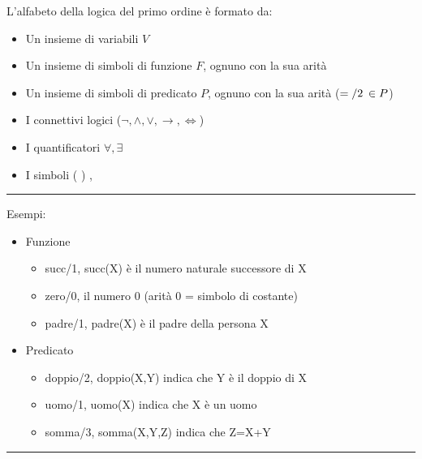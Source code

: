 \documentclass{article}
\begin{document}
L'alfabeto della logica del primo ordine è formato da:
\begin{itemize}
    \item Un insieme di variabili $V$
    \item Un insieme di simboli di funzione $F$, ognuno con la sua arità
    \item Un insieme di simboli di predicato $P$, ognuno con la sua arità ($=/2\text{\hspace{2pt}}\in P$)
    \item I connettivi logici ($\neg,\wedge,\vee,\rightarrow,\iff$)
    \item I quantificatori $\forall,\exists$
    \item I simboli ( ) ,
\end{itemize}

\noindent\rule{\textwidth}{0.5pt}

\noindent Esempi:
\begin{itemize}
    \item Funzione
        \begin{itemize}
            \item succ/1, succ(X) è il numero naturale successore di X
            \item zero/0, il numero 0 (arità 0 = simbolo di costante)
            \item padre/1, padre(X) è il padre della persona X
        \end{itemize}
    \item Predicato
        \begin{itemize}
            \item doppio/2, doppio(X,Y) indica che Y è il doppio di X
            \item uomo/1, uomo(X) indica che X è un uomo
            \item somma/3, somma(X,Y,Z) indica che Z=X+Y
        \end{itemize}
\end{itemize}

\noindent\rule{\textwidth}{0.5pt}\newline
\end{document}
